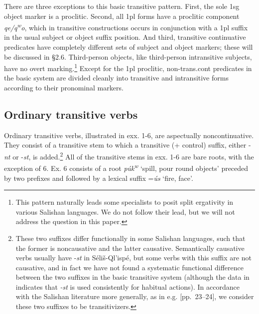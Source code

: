 \documentclass[output=paper,colorlinks,citecolor=brown]{langscibook}
\begin{document}
There are three exceptions to this basic transitive pattern.  First,
the sole 1sg object marker is a proclitic.  Second, all 1pl forms have
a proclitic component \emph{qe/{q\textsuperscript w}o}, which in
transitive constructions occurs in conjunction with a 1pl suffix in the
usual subject or object suffix position.  And third, transitive
continuative predicates have completely different sets of subject and
object markers; these will be discussed in \S 2.6.  Third-person
objects, like third-person intransitive subjects, have no overt
marking.\footnote{This pattern naturally leads some specialists to
posit split ergativity in various Salishan languages.  We do not
follow their lead, but we will not address the question in this
paper.}  Except for the 1pl proclitic, non-trans.cont predicates in
the basic system are divided cleanly into transitive and intransitive
forms according to their pronominal markers.

\subsection{Ordinary transitive verbs}  %

  Ordinary transitive verbs, illustrated in exx. 1-6, are aspectually
  noncontinuative.  They consist of a transitive stem to which a
  transitive (+ control) suffix, either -\emph{nt} or -\emph{st}, is
  added.\footnote{These two suffixes differ functionally in some
  Salishan languages, such that the former is noncausative and the
  latter causative.  Semantically causative verbs usually have
  -\emph{st} in S\'eli\v{s}-Ql'isp\'e, but some verbs with this
  suffix are not causative, and in fact we have not found a
  systematic functional difference between the two suffixes in the
  basic transitive system (although the data in
  \cite{Mengarinietal.:1877} indicates that \emph{-st} is used
  consistently for habitual actions). In accordance with the Salishan
  literature more generally, as in
  e.g. \cite{Mattina&Montler:1990}[pp.~23--24], we consider these
  two suffixes to be transitivizers.}  All of the transitive stems in
  exx. 1-6 are bare roots, with the exception of 6.  Ex. 6 consists
  of a root \emph{p\'uk\textsuperscript w} `spill, pour round
  objects' preceded by two prefixes and followed by a lexical suffix
  =\emph{\'us} `fire, face'.
\end{document}
